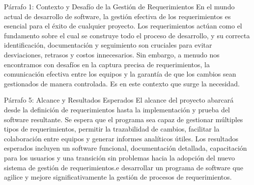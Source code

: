 Párrafo 1: Contexto y Desafío de la Gestión de Requerimientos
En el mundo actual de desarrollo de software, la gestión efectiva de los requerimientos es esencial para el éxito de cualquier proyecto. Los requerimientos actúan como el fundamento sobre el cual se construye todo el proceso de desarrollo, y su correcta identificación, documentación y seguimiento son cruciales para evitar desviaciones, retrasos y costos innecesarios. Sin embargo, a menudo nos encontramos con desafíos en la captura precisa de requerimientos, la comunicación efectiva entre los equipos y la garantía de que los cambios sean gestionados de manera controlada. Es en este contexto que surge la necesidad.

Párrafo 5: Alcance y Resultados Esperados El alcance del proyecto abarcará desde la definición de requerimientos hasta la implementación y prueba del software resultante. Se espera que el programa sea capaz de gestionar múltiples tipos de requerimientos, permitir la trazabilidad de cambios, facilitar la colaboración entre equipos y generar informes analíticos útiles. Los resultados esperados incluyen un software funcional, documentación detallada, capacitación para los usuarios y una transición sin problemas hacia la adopción del nuevo sistema de gestión de requerimientos.e desarrollar un programa de software que agilice y mejore significativamente la gestión de procesos de requerimientos.

